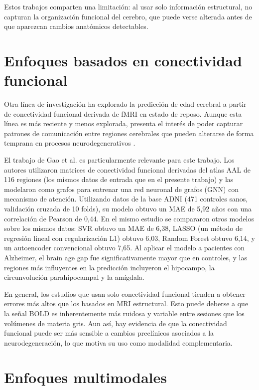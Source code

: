 Estos trabajos comparten una limitación: al usar solo información estructural, no capturan la organización funcional del cerebro, que puede verse alterada antes de que aparezcan cambios anatómicos detectables.

\section{Enfoques basados en conectividad funcional}

Otra línea de investigación ha explorado la predicción de edad cerebral a partir de conectividad funcional derivada de fMRI en estado de reposo. Aunque esta línea es más reciente y menos explorada, presenta el interés de poder capturar patrones de comunicación entre regiones cerebrales que pueden alterarse de forma temprana en procesos neurodegenerativos \cite{smitha2017resting}.

El trabajo de Gao et al. \cite{gao2023brain} es particularmente relevante para este trabajo. Los autores utilizaron matrices de conectividad funcional derivadas del atlas AAL de 116 regiones (los mismos datos de entrada que en el presente trabajo) y las modelaron como grafos para entrenar una red neuronal de grafos (GNN) con mecanismo de atención. Utilizando datos de la base ADNI (471 controles sanos, validación cruzada de 10 folds), su modelo obtuvo un MAE de 5,92 años con una correlación de Pearson de 0,44. En el mismo estudio se compararon otros modelos sobre los mismos datos: SVR obtuvo un MAE de 6,38, LASSO (un método de regresión lineal con regularización L1) obtuvo 6,03, Random Forest obtuvo 6,14, y un autoencoder convencional obtuvo 7,65. Al aplicar el modelo a pacientes con Alzheimer, el brain age gap fue significativamente mayor que en controles, y las regiones más influyentes en la predicción incluyeron el hipocampo, la circunvolución parahipocampal y la amígdala.

En general, los estudios que usan solo conectividad funcional tienden a obtener errores más altos que los basados en MRI estructural. Esto puede deberse a que la señal BOLD es inherentemente más ruidosa y variable entre sesiones que los volúmenes de materia gris. Aun así, hay evidencia de que la conectividad funcional puede ser más sensible a cambios preclínicos asociados a la neurodegeneración, lo que motiva su uso como modalidad complementaria.

\section{Enfoques multimodales}

